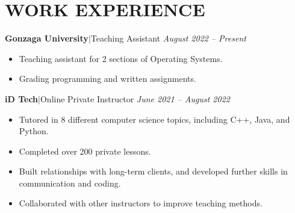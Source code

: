 \documentclass[11pt, a4paper, roman]{moderncv}
\newcommand{\entry}[4]{
	\textbf{#1}\:$|$\:#2 
	\hfill\textit{#3}
	#4
	\vspace{2mm}
}
\begin{document}
\vspace*{-2mm}
\section{WORK EXPERIENCE}

\entry{Gonzaga University}{Teaching Assistant}{August 2022 -- Present}
{\begin{itemize}
	\item Teaching assistant for 2 sections of Operating Systems.
	\item Grading programming and written assignments.
\end{itemize}
}

\entry{iD Tech}{Online Private Instructor}{June 2021 -- August 2022}
{\begin{itemize}
    \item Tutored in 8 different computer science topics, including C++, Java, and Python.
    \item Completed over 200 private lessons.
    \item Built relationships with long-term clients, and developed further skills in communication and coding.
    \item Collaborated with other instructors to improve teaching methods.
  \end{itemize}
}


\end{document}
